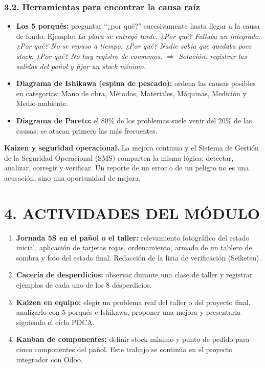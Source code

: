 \subsubsection*{3.2. Herramientas para encontrar la causa raíz}
\begin{itemize}
  \item \textbf{Los 5 porqués:} preguntar ``¿por qué?'' sucesivamente hasta llegar a la causa
        de fondo. Ejemplo: \textit{La placa se entregó tarde. ¿Por qué? Faltaba un integrado.
        ¿Por qué? No se repuso a tiempo. ¿Por qué? Nadie sabía que quedaba poco stock. ¿Por
        qué? No hay registro de consumos. $\Rightarrow$ Solución: registrar las salidas del
        pañol y fijar un stock mínimo.}
  \item \textbf{Diagrama de Ishikawa (espina de pescado):} ordena las causas posibles en
        categorías: Mano de obra, Métodos, Materiales, Máquinas, Medición y Medio ambiente.
  \item \textbf{Diagrama de Pareto:} el 80\% de los problemas suele venir del 20\% de las
        causas; se atacan primero las más frecuentes.
\end{itemize}

\begin{recuadro}
\textbf{Kaizen y seguridad operacional.} La mejora continua y el Sistema de Gestión de la
Seguridad Operacional (SMS) comparten la misma lógica: detectar, analizar, corregir y
verificar. Un reporte de un error o de un peligro no es una acusación, sino una oportunidad de
mejora.
\end{recuadro}

\section*{4. ACTIVIDADES DEL MÓDULO}

\begin{enumerate}
  \item \textbf{Jornada 5S en el pañol o el taller:} relevamiento fotográfico del estado
        inicial, aplicación de tarjetas rojas, ordenamiento, armado de un tablero de sombra y
        foto del estado final. Redacción de la lista de verificación (Seiketsu).
  \item \textbf{Cacería de desperdicios:} observar durante una clase de taller y registrar
        ejemplos de cada uno de los 8 desperdicios.
  \item \textbf{Kaizen en equipo:} elegir un problema real del taller o del proyecto final,
        analizarlo con 5 porqués e Ishikawa, proponer una mejora y presentarla siguiendo el
        ciclo PDCA.
  \item \textbf{Kanban de componentes:} definir stock mínimo y punto de pedido para cinco
        componentes del pañol. Este trabajo se continúa en el proyecto integrador con Odoo.
\end{enumerate}
